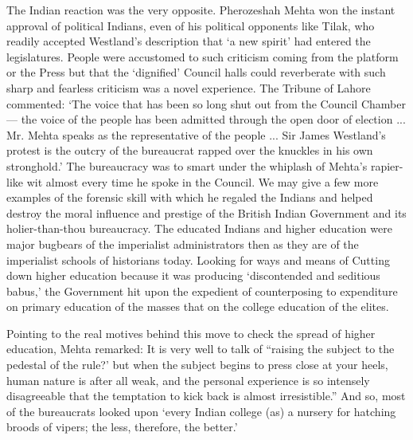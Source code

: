 The Indian reaction was the very opposite. Pherozeshah Mehta won the instant approval of political Indians, even of his political opponents like Tilak, who readily accepted Westland's description that `a new spirit' had entered the legislatures. People were accustomed to such criticism coming from the platform or the Press but that the `dignified' Council halls could reverberate with such sharp and fearless criticism was a novel experience. The Tribune of Lahore commented: `The voice that has been so long shut out from the Council Chamber --- the voice of the people has been admitted through the open door of election ... Mr. Mehta speaks as the representative of the people ... Sir James Westland's protest is the outcry of the bureaucrat rapped over the knuckles in his own stronghold.' The bureaucracy was to smart under the whiplash of Mehta's rapier-like wit almost every time he spoke in the Council. We may give a few more examples of the forensic skill with which he regaled the Indians and helped destroy the moral influence and prestige of the British Indian Government and its holier-than-thou bureaucracy. The educated Indians and higher education were major bugbears of the imperialist administrators then as they are of the imperialist schools of historians today. Looking for ways and means of Cutting down higher education because it was producing `discontended and seditious babus,' the Government hit upon the expedient of counterposing to expenditure on primary education of the masses that on the college education of the elites.

Pointing to the real motives behind this move to check the spread of higher education, Mehta remarked: It is very well to talk of ``raising the subject to the pedestal of the rule?' but when the subject begins to press close at your heels, human nature is after all weak, and the personal experience is so intensely disagreeable that the temptation to kick back is almost irresistible.'' And so, most of the bureaucrats looked upon `every Indian college (as) a nursery for hatching broods of vipers; the less, therefore, the better.'

